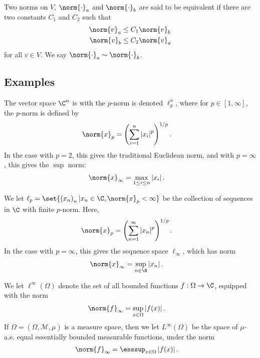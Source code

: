 \documentclass[10pt]{mypackage}
\begin{document}
\begin{definition}
  Two norms on $V$, $\norm{\cdot}_{a}$ and $\norm{\cdot}_{b}$ are said to be equivalent if there are two constants $C_1$ and $C_2$ such that
  \begin{align*}
    \norm{v}_{a} &\leq C_1\norm{v}_b\\
    \norm{v}_{b} &\leq C_2\norm{v}_a
  \end{align*}
  for all $v\in V$. We say $\norm{\cdot}_{a}\sim \norm{\cdot}_{b}$.
\end{definition}
\subsection{Examples}%
\begin{example}
  The vector space $\C^n$ is with the $p$-norm is denoted $\ell_{p}^{n}$, where for $p \in [1,\infty]$, the $p$-norm is defined by
  \begin{align*}
    \norm{x}_{p} &= \left(\sum_{i=1}^{n}\left\vert x_i \right\vert^p\right)^{1/p}.
  \end{align*}
  In the case with $p=2$, this gives the traditional Euclidean norm, and with $p = \infty$, this gives the $\sup$ norm:
  \begin{align*}
    \norm{x}_{\infty} &= \max_{1\leq i \leq n}\left\vert x_i \right\vert.
  \end{align*}
\end{example}
\begin{example}
  We let $\ell_{p} = \set{\left(x_{n}\right)_n| x_n\in \C,\norm{x}_p < \infty}$ be the collection of sequences in $\C$ with finite $p$-norm. Here,
  \begin{align*}
    \norm{x}_p &= \left(\sum_{n=1}^{\infty}\left\vert x_n \right\vert^p\right)^{1/p}.
  \end{align*}
  In the case with $p = \infty$, this gives the sequence space $\ell_{\infty}$, which has norm
  \begin{align*}
    \norm{x}_{\infty} &= \sup_{n\in \N}\left\vert x_n \right\vert.
  \end{align*}
\end{example}
\begin{example}
  We let $\ell^{\infty}\left(\Omega\right)$ denote the set of all bounded functions $f: \Omega \rightarrow \C$, equipped with the norm
  \begin{align*}
    \norm{f}_{\infty} &= \sup_{x\in \Omega}\left\vert f(x) \right\vert.
  \end{align*}
  If $\Omega = \left(\Omega,\mathcal{M},\mu\right)$ is a measure space, then we let $L^{\infty}\left(\Omega\right)$ be the space of $\mu$-a.e. equal essentially bounded measurable functions, under the norm
  \begin{align*}
    \norm{f}_{\infty} &= \esssup_{x\in \Omega}\left\vert f(x) \right\vert.
  \end{align*}
\end{example}
\end{document}
